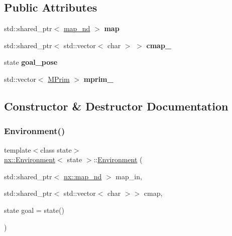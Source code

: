 \subsection*{Public Attributes}
\begin{DoxyCompactItemize}
\item 
\mbox{\label{classnx_1_1Environment_a5074fd389af065716dd7455e6eb58a10}} 
std\+::shared\+\_\+ptr$<$ \hyperlink{classnx_1_1map__nd}{map\+\_\+nd} $>$ {\bfseries map}
\item 
\mbox{\label{classnx_1_1Environment_a830b47524856d2074908a09883816a66}} 
std\+::shared\+\_\+ptr$<$ std\+::vector$<$ char $>$ $>$ {\bfseries cmap\+\_\+}
\item 
\mbox{\label{classnx_1_1Environment_a55d4d93f32e8259e2355f281ce290e02}} 
state {\bfseries goal\+\_\+pose}
\item 
\mbox{\label{classnx_1_1Environment_af682fbcf24d8ec4ad43a80d0ccd64bba}} 
std\+::vector$<$ \hyperlink{structnx_1_1MotionPrimitive}{M\+Prim} $>$ {\bfseries mprim\+\_\+}
\end{DoxyCompactItemize}


\subsection{Constructor \& Destructor Documentation}
\mbox{\label{classnx_1_1Environment_a23652067c6e2c838b7e895ada850fa6b}} 
\subsubsection{\texorpdfstring{Environment()}{Environment()}}
{\footnotesize\ttfamily template$<$class state$>$ \\
\hyperlink{classnx_1_1Environment}{nx\+::\+Environment}$<$ state $>$\+::\hyperlink{classnx_1_1Environment}{Environment} (\begin{DoxyParamCaption}\item[{std\+::shared\+\_\+ptr$<$ \hyperlink{classnx_1_1map__nd}{nx\+::map\+\_\+nd} $>$}]{map\+\_\+in,  }\item[{std\+::shared\+\_\+ptr$<$ std\+::vector$<$ char $>$$>$}]{cmap,  }\item[{state}]{goal = {\ttfamily state()} }\end{DoxyParamCaption})\hspace{0.3cm}{\ttfamily [inline]}}

